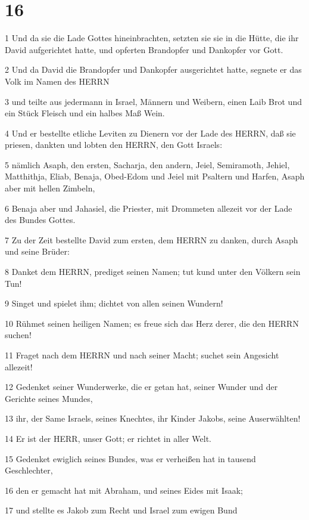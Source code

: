 \chapter{16}

\par 1 Und da sie die Lade Gottes hineinbrachten, setzten sie sie in die Hütte, die ihr David aufgerichtet hatte, und opferten Brandopfer und Dankopfer vor Gott.
\par 2 Und da David die Brandopfer und Dankopfer ausgerichtet hatte, segnete er das Volk im Namen des HERRN
\par 3 und teilte aus jedermann in Israel, Männern und Weibern, einen Laib Brot und ein Stück Fleisch und ein halbes Maß Wein.
\par 4 Und er bestellte etliche Leviten zu Dienern vor der Lade des HERRN, daß sie priesen, dankten und lobten den HERRN, den Gott Israels:
\par 5 nämlich Asaph, den ersten, Sacharja, den andern, Jeiel, Semiramoth, Jehiel, Matthithja, Eliab, Benaja, Obed-Edom und Jeiel mit Psaltern und Harfen, Asaph aber mit hellen Zimbeln,
\par 6 Benaja aber und Jahasiel, die Priester, mit Drommeten allezeit vor der Lade des Bundes Gottes.
\par 7 Zu der Zeit bestellte David zum ersten, dem HERRN zu danken, durch Asaph und seine Brüder:
\par 8 Danket dem HERRN, prediget seinen Namen; tut kund unter den Völkern sein Tun!
\par 9 Singet und spielet ihm; dichtet von allen seinen Wundern!
\par 10 Rühmet seinen heiligen Namen; es freue sich das Herz derer, die den HERRN suchen!
\par 11 Fraget nach dem HERRN und nach seiner Macht; suchet sein Angesicht allezeit!
\par 12 Gedenket seiner Wunderwerke, die er getan hat, seiner Wunder und der Gerichte seines Mundes,
\par 13 ihr, der Same Israels, seines Knechtes, ihr Kinder Jakobs, seine Auserwählten!
\par 14 Er ist der HERR, unser Gott; er richtet in aller Welt.
\par 15 Gedenket ewiglich seines Bundes, was er verheißen hat in tausend Geschlechter,
\par 16 den er gemacht hat mit Abraham, und seines Eides mit Isaak;
\par 17 und stellte es Jakob zum Recht und Israel zum ewigen Bund
